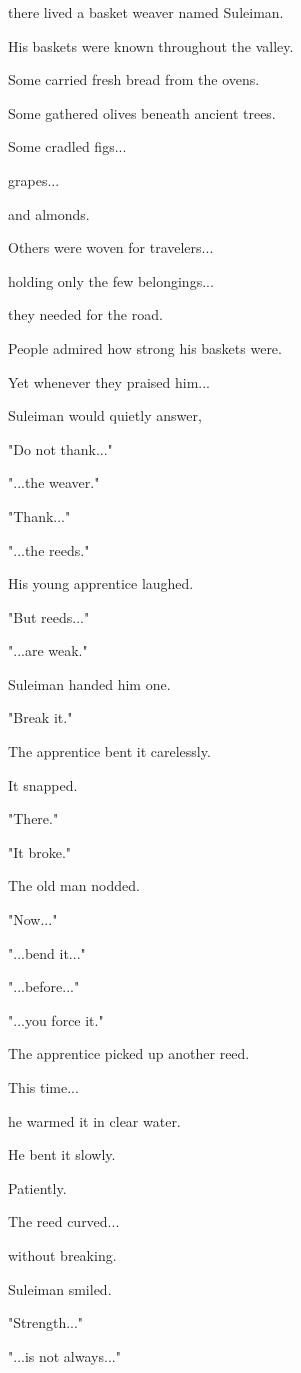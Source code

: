 \documentclass[12pt,openany]{book}
\begin{document}
there lived a basket weaver named Suleiman.

His baskets were known throughout the valley.

Some carried fresh bread from the ovens.

Some gathered olives beneath ancient trees.

Some cradled figs...

grapes...

and almonds.

Others were woven for travelers...

holding only the few belongings...

they needed for the road.

People admired how strong his baskets were.

Yet whenever they praised him...

Suleiman would quietly answer,

"Do not thank..."

"...the weaver."

"Thank..."

"...the reeds."

His young apprentice laughed.

"But reeds..."

"...are weak."

Suleiman handed him one.

"Break it."

The apprentice bent it carelessly.

It snapped.

"There."

"It broke."

The old man nodded.

"Now..."

"...bend it..."

"...before..."

"...you force it."

The apprentice picked up another reed.

This time...

he warmed it in clear water.

He bent it slowly.

Patiently.

The reed curved...

without breaking.

Suleiman smiled.

"Strength..."

"...is not always..."
\end{document}
